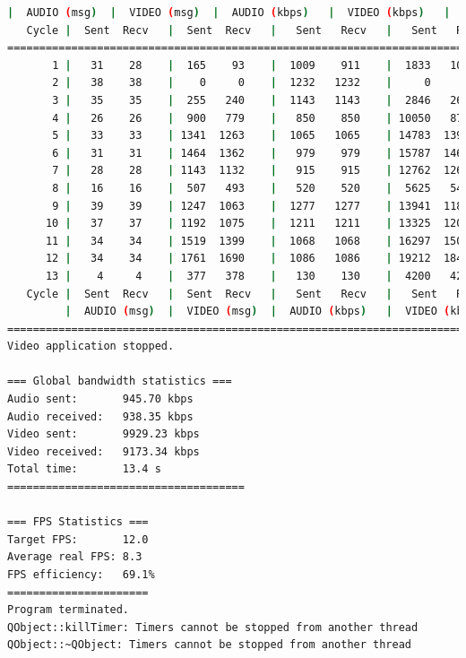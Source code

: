 \begin{lstlisting}[language=bash,basicstyle=\ttfamily\tiny]
         |  AUDIO (msg)  |  VIDEO (msg)  |  AUDIO (kbps)   |  VIDEO (kbps)   |     CPU (%) 
   Cycle |  Sent  Recv   |  Sent  Recv   |   Sent   Recv   |   Sent   Recv   | Program System
================================================================================================
       1 |   31    28    |  165    93    |  1009    911    |  1833   1034    |  23      0       
       2 |   38    38    |    0     0    |  1232   1232    |     0      0    |  44     76       
       3 |   35    35    |  255   240    |  1143   1143    |  2846   2676    |  40     79       
       4 |   26    26    |  900   779    |   850    850    | 10050   8701    |  35     70       
       5 |   33    33    | 1341  1263    |  1065   1065    | 14783  13922    |  34     72       
       6 |   31    31    | 1464  1362    |   979    979    | 15787  14686    |  36     62       
       7 |   28    28    | 1143  1132    |   915    915    | 12762  12640    |  36     51       
       8 |   16    16    |  507   493    |   520    520    |  5625   5471    |  30     29       
       9 |   39    39    | 1247  1063    |  1277   1277    | 13941  11882    |  43     73       
      10 |   37    37    | 1192  1075    |  1211   1211    | 13325  12020    |  53     66       
      11 |   34    34    | 1519  1399    |  1068   1068    | 16297  15010    |  40     72       
      12 |   34    34    | 1761  1690    |  1086   1086    | 19212  18436    |  48     67       
      13 |    4     4    |  377   378    |   130    130    |  4200   4213    |   9     41       
   Cycle |  Sent  Recv   |  Sent  Recv   |   Sent   Recv   |   Sent   Recv   | Program System
         |  AUDIO (msg)  |  VIDEO (msg)  |  AUDIO (kbps)   |  VIDEO (kbps)   |     CPU (%) 
===========================================================================================
Video application stopped.

=== Global bandwidth statistics ===
Audio sent:       945.70 kbps
Audio received:   938.35 kbps
Video sent:       9929.23 kbps
Video received:   9173.34 kbps
Total time:       13.4 s
=====================================

=== FPS Statistics ===
Target FPS:       12.0
Average real FPS: 8.3
FPS efficiency:   69.1%
======================
Program terminated.
QObject::killTimer: Timers cannot be stopped from another thread
QObject::~QObject: Timers cannot be stopped from another thread
\end{lstlisting}

